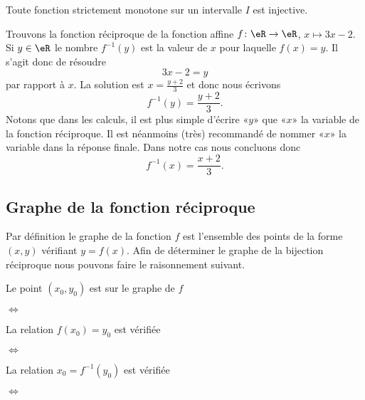 \begin{remark}
  Toute fonction strictement monotone sur un intervalle $I$ est injective.
\end{remark}

\begin{example}
    Trouvons la fonction réciproque de la fonction affine \( f\colon \eR\to \eR\), \( x\mapsto 3x-2\). Si \( y\in \eR\) le nombre \( f^{-1}(y)\) est la valeur de \( x\) pour laquelle \( f(x)=y\). Il s'agit donc de résoudre
    \begin{equation}
        3x-2=y
    \end{equation}
    par rapport à \( x\). La solution est \( x=\frac{ y+2 }{ 3 }\) et donc nous écrivons
    \begin{equation}
        f^{-1}(y)=\frac{ y+2 }{ 3 }.
    \end{equation}
    Notons que dans les calculs, il est plus simple d'écrire «\( y\)» que «\( x\)» la variable de la fonction réciproque. Il est néanmoins (très) recommandé de nommer «\( x\)» la variable dans la réponse finale. Dans notre cas nous concluons donc
    \begin{equation}
        f^{-1}(x)=\frac{ x+2 }{ 3 }.
    \end{equation}
\end{example}

\subsection{Graphe de la fonction réciproque}

Par définition le graphe de la fonction \( f\) est l'ensemble des points de la forme \( (x,y)\) vérifiant \( y=f(x)\). Afin de déterminer le graphe de la bijection réciproque nous pouvons faire le raisonnement suivant.

        Le point \( (x_0,y_0)\) est sur le graphe de \( f\)

\noindent\( \Leftrightarrow\)

        La relation \( f(x_0)=y_0\) est vérifiée

\noindent\( \Leftrightarrow\)

        La relation \( x_0=f^{-1}(y_0)\) est vérifiée

\noindent\( \Leftrightarrow\)

